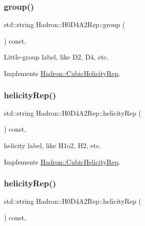 \subsubsection{\texorpdfstring{group()}{group()}\hspace{0.1cm}{\footnotesize\ttfamily [5/5]}}
{\footnotesize\ttfamily std\+::string Hadron\+::\+H0\+D4\+A2\+Rep\+::group (\begin{DoxyParamCaption}{ }\end{DoxyParamCaption}) const\hspace{0.3cm}{\ttfamily [inline]}, {\ttfamily [virtual]}}

Little-\/group label, like D2, D4, etc. 

Implements \mbox{\hyperlink{structHadron_1_1CubicHelicityRep_a101a7d76cd8ccdad0f272db44b766113}{Hadron\+::\+Cubic\+Helicity\+Rep}}.

\mbox{\label{structHadron_1_1H0D4A2Rep_a4998188757fbc152763b632ab09afbcf}} 
\subsubsection{\texorpdfstring{helicityRep()}{helicityRep()}\hspace{0.1cm}{\footnotesize\ttfamily [1/3]}}
{\footnotesize\ttfamily std\+::string Hadron\+::\+H0\+D4\+A2\+Rep\+::helicity\+Rep (\begin{DoxyParamCaption}{ }\end{DoxyParamCaption}) const\hspace{0.3cm}{\ttfamily [inline]}, {\ttfamily [virtual]}}

helicity label, like H1o2, H2, etc. 

Implements \mbox{\hyperlink{structHadron_1_1CubicHelicityRep_af1096946b7470edf0a55451cc662f231}{Hadron\+::\+Cubic\+Helicity\+Rep}}.

\mbox{\label{structHadron_1_1H0D4A2Rep_a4998188757fbc152763b632ab09afbcf}} 
\subsubsection{\texorpdfstring{helicityRep()}{helicityRep()}\hspace{0.1cm}{\footnotesize\ttfamily [2/3]}}
{\footnotesize\ttfamily std\+::string Hadron\+::\+H0\+D4\+A2\+Rep\+::helicity\+Rep (\begin{DoxyParamCaption}{ }\end{DoxyParamCaption}) const\hspace{0.3cm}{\ttfamily [inline]}, {\ttfamily [virtual]}}

